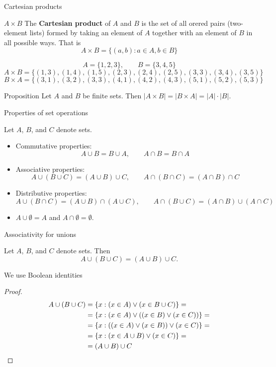 \documentclass{beamer}
\def\bl[#1]#2{\begin{block}{#1}#2\end{block}}
\begin{document}
\begin{frame}{Cartesian products}
\bl[$A\times B$]{
The \textbf{Cartesian product} of $A$ and $B$ is the set of all orered pairs (two-element lists) formed by taking an element of $A$ together with an element of $B$ in all possible ways. That is
\[
A\times B=\{(a,b): a\in A, b\in B\}
\]}
\[
A=\{1,2,3\},\qquad B=\{3,4,5\}
\]
\[
A\times B=\{(1,3), (1,4),(1,5),(2,3),(2,4),(2,5),(3,3),(3,4),(3,5)\}
\]
\[
B\times A=\{(3,1),(3,2),(3,3),(4,1),(4,2),(4,3),(5,1),(5,2),(5,3)\}
\]\vspace{-0.5cm}\pause

\bl[Proposition]{
Let $A$ and $B$ be finite sets. Then $|A\times B|=|B\times A|=|A|\cdot|B|$.}

\end{frame}

\begin{frame}{Properties of set operations}
\begin{theorem}
Let $A$, $B$, and $C$ denote sets.
\begin{itemize}
\item Commutative properties:
\[
A\cup B=B\cup A,\qquad A\cap B=B\cap A
\] 
\item Associative properties:
\[
A\cup(B\cup C)=(A\cup B)\cup C,\qquad A\cap(B\cap C)=(A\cap B)\cap C
\]
\item Distributive properties:
\[
A\cup(B\cap C)=(A\cup B)\cap (A\cup C),\qquad A\cap(B\cup C)=(A\cap B)\cup (A\cap C)
\]
\item $A\cup \emptyset=A$ and $A\cap\emptyset=\emptyset$.
\end{itemize}
\end{theorem}
\end{frame}



\begin{frame}{Associativity for unions}

\begin{theorem}
Let $A$, $B$, and $C$ denote sets. Then
\[
A\cup(B\cup C)=(A\cup B)\cup C.
\]
\end{theorem}
We use Boolean identities 
\begin{proof}
\begin{align*}
A\cup(B\cup C)&=\{x:(x\in A)\vee(x\in B\cup C)\}=\\
&=\{x: (x\in A)\vee((x\in B)\vee(x\in C))\}=\\
&=\{x:((x\in A)\vee(x\in B))\vee(x\in C)\}=\\
&=\{x: (x\in A\cup B)\vee(x\in C)\}=\\
&=(A\cup B)\cup C\qedhere
\end{align*}\vspace{-0.5cm}
\end{proof}
\end{frame}
\end{document}
